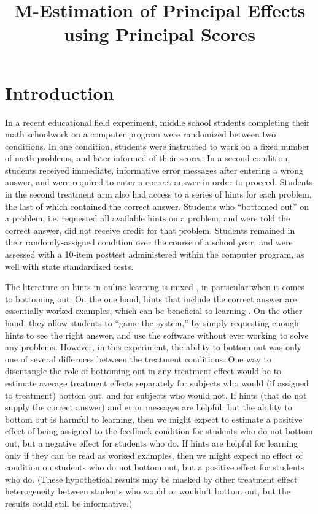 \documentclass[11pt]{article} %
\title{M-Estimation of Principal Effects using Principal Scores}
\begin{document}
\maketitle

\section{Introduction}



In a recent educational field experiment, middle school students completing their math schoolwork on a computer program were randomized between two conditions. In one condition, students were instructed to work on a fixed number of math problems, and later informed of their scores. In a second condition, students received immediate, informative error messages after entering a wrong answer, and were required to enter a correct answer in order to proceed. Students in the second treatment arm also had access to a series of hints for each problem, the last of which contained the correct answer. Students who ``bottomed out'' on a problem, i.e. requested all available hints on a problem, and were told the correct answer, did not receive credit for that problem. Students remained in their randomly-assigned condition over the course of a school year, and were assessed with a 10-item posttest administered within the computer program, as well with state standardized tests.

The literature on hints in online learning is mixed \citep{stuff}, in particular when it comes to bottoming out. On the one hand, hints that include the correct answer are essentially worked examples, which can be beneficial to learning \citep{worked example stuff}. On the other hand, they allow students to ``game the system,'' by simply requesting enough hints to see the right answer, and use the software without ever working to solve any problems. However, in this experiment, the ability to bottom out was only one of several differnces between the treatment conditions. One way to disentangle the role of bottoming out in any treatment effect would be to estimate average treatment effects separately for subjects who would (if assigned to treatment) bottom out, and for subjects who would not. If hints (that do not supply the correct answer) and error messages are helpful, but the ability to bottom out is harmful to learning, then we might expect to estimate a positive effect of being assigned to the feedback condition for students who do not bottom out, but a negative effect for students who do. If hints are helpful for learning only if they can be read as worked examples, then we might expect no effect of condition on students who do not bottom out, but a positive effect for students who do. (These hypothetical results may be masked by other treatment effect heterogeneity between students who would or wouldn't bottom out, but the results could still be informative.)
\end{document}
